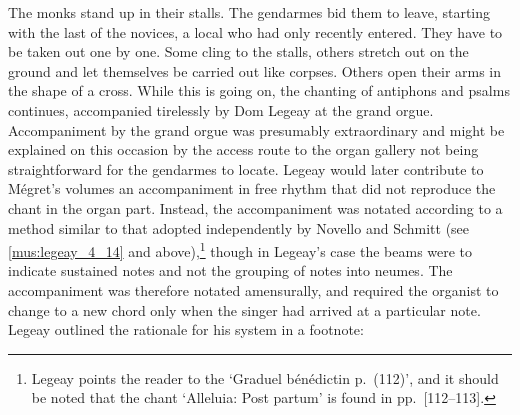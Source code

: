   {\cite[p.~54 after the account by Étienne Cartier in \emph{Les moines de Solesmes -- expulsions du 6 novembre 1880 et du 22 mars 1882}]{SoltnerAbbayeSolesmesaux2005}}
{The monks stand up in their stalls. The gendarmes bid them to leave, starting with the last of the novices, a local who had only recently entered. They have to be taken out one by one. Some cling to the stalls, others stretch out on the ground and let themselves be carried out like corpses. Others open their arms in the shape of a cross. While this is going on, the chanting of antiphons and psalms continues, accompanied tirelessly by Dom Legeay at the grand orgue.}
\pagebreak{}
\noindent
Accompaniment by the grand orgue was presumably extraordinary and might be explained on this occasion by the access route to the organ gallery not being straightforward for the gendarmes to locate.
Legeay would later contribute to Mégret's volumes an accompaniment in free rhythm that did not reproduce the chant in the organ part.
\label{ln:novello_legeay}%
Instead, the accompaniment was notated according to a method similar to that adopted independently by Novello and Schmitt (see \cref{mus:legeay_4_14} and  above),\footnote{Legeay points the reader to the `Graduel bénédictin p.~(112)', and it should be noted that the chant `Alleluia: Post partum' is found in \cite{PothierLiberGradualis1883} pp.~[112--113].} though in Legeay's case the beams were to indicate sustained notes and not the grouping of notes into neumes.
The accompaniment was therefore notated amensurally, and required the organist to change to a new chord only when the singer had arrived at a particular note.
Legeay outlined the rationale for his system in a footnote:
\noclub[2]
%

